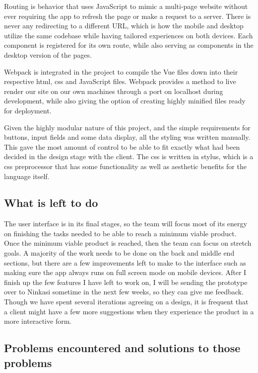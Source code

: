 \documentclass[draftclsnofoot,onecolumn,letterpaper,10pt,compsoc]{IEEEtran}
\begin{document}
Routing is behavior that uses JavaScript to mimic a multi-page website without ever requiring the app to refresh the page or make a request to a server.
There is never any redirecting to a different URL, which is how the mobile and desktop utilize the same codebase while having tailored experiences on both devices.
Each component is registered for its own route, while also serving as components in the desktop version of the pages.


Webpack is integrated in the project to compile the Vue files down into their respective html, css and JavaScript files.
Webpack provides a method to live render our site on our own machines through a port on localhost during development, while also giving the option of creating highly minified files ready for deployment.


Given the highly modular nature of this project, and the simple requirements for buttons, input fields and some data display, all the styling was written manually.
This gave the most amount of control to be able to fit exactly what had been decided in the design stage with the client.
The css is written in stylus, which is a css preprocessor that has some functionality as well as aesthetic benefits for the language itself.




\subsection{What is left to do}


The user interface is in its final stages, so the team will focus most of its energy on finishing the tasks needed to be able to reach a minimum viable product.
Once the minimum viable product is reached, then the team can focus on stretch goals.
A majority of the work needs to be done on the back and middle end sections, but there are a few improvements left to make to the interface such as making sure the app always runs on full screen mode on mobile devices.
After I finish up the few features I have left to work on, I will be sending the prototype over to Ninkasi sometime in the next few weeks, so they can give me feedback.
Though we have spent several iterations agreeing on a design, it is frequent that a client might have a few more suggestions when they experience the product in a more interactive form.


\subsection{Problems encountered and solutions to those problems}
\end{document}
